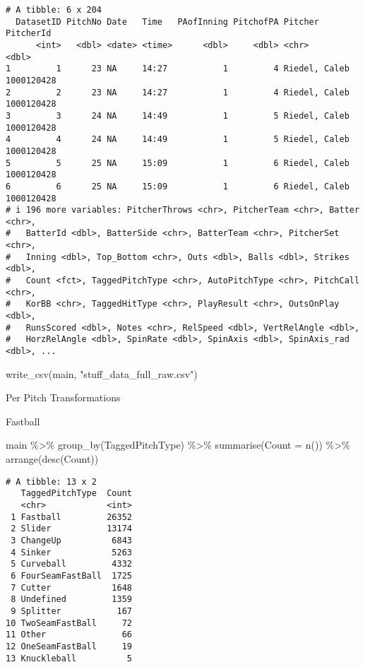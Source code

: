 \documentclass[
  letterpaper,
  DIV=11,
  numbers=noendperiod]{scrartcl}
\newenvironment{Shaded}{\begin{snugshade}}{\end{snugshade}}
\newcommand{\AttributeTok}[1]{\textcolor[rgb]{0.40,0.45,0.13}{#1}}
\newcommand{\FunctionTok}[1]{\textcolor[rgb]{0.28,0.35,0.67}{#1}}
\newcommand{\NormalTok}[1]{\textcolor[rgb]{0.00,0.23,0.31}{#1}}
\newcommand{\SpecialCharTok}[1]{\textcolor[rgb]{0.37,0.37,0.37}{#1}}
\newcommand{\StringTok}[1]{\textcolor[rgb]{0.13,0.47,0.30}{#1}}
\begin{document}
\begin{verbatim}
# A tibble: 6 x 204
  DatasetID PitchNo Date   Time   PAofInning PitchofPA Pitcher        PitcherId
      <int>   <dbl> <date> <time>      <dbl>     <dbl> <chr>              <dbl>
1         1      23 NA     14:27           1         4 Riedel, Caleb 1000120428
2         2      23 NA     14:27           1         4 Riedel, Caleb 1000120428
3         3      24 NA     14:49           1         5 Riedel, Caleb 1000120428
4         4      24 NA     14:49           1         5 Riedel, Caleb 1000120428
5         5      25 NA     15:09           1         6 Riedel, Caleb 1000120428
6         6      25 NA     15:09           1         6 Riedel, Caleb 1000120428
# i 196 more variables: PitcherThrows <chr>, PitcherTeam <chr>, Batter <chr>,
#   BatterId <dbl>, BatterSide <chr>, BatterTeam <chr>, PitcherSet <chr>,
#   Inning <dbl>, Top_Bottom <chr>, Outs <dbl>, Balls <dbl>, Strikes <dbl>,
#   Count <fct>, TaggedPitchType <chr>, AutoPitchType <chr>, PitchCall <chr>,
#   KorBB <chr>, TaggedHitType <chr>, PlayResult <chr>, OutsOnPlay <dbl>,
#   RunsScored <dbl>, Notes <chr>, RelSpeed <dbl>, VertRelAngle <dbl>,
#   HorzRelAngle <dbl>, SpinRate <dbl>, SpinAxis <dbl>, SpinAxis_rad <dbl>, ...
\end{verbatim}

\begin{Shaded}
\begin{Highlighting}[]
\FunctionTok{write\_csv}\NormalTok{(main, }\StringTok{"stuff\_data\_full\_raw.csv"}\NormalTok{)}
\end{Highlighting}
\end{Shaded}

Per Pitch Transformations

Fastball

\begin{Shaded}
\begin{Highlighting}[]
\NormalTok{main }\SpecialCharTok{\%\textgreater{}\%} 
  \FunctionTok{group\_by}\NormalTok{(TaggedPitchType) }\SpecialCharTok{\%\textgreater{}\%}
  \FunctionTok{summarise}\NormalTok{(}\AttributeTok{Count =} \FunctionTok{n}\NormalTok{()) }\SpecialCharTok{\%\textgreater{}\%}
  \FunctionTok{arrange}\NormalTok{(}\FunctionTok{desc}\NormalTok{(Count))}
\end{Highlighting}
\end{Shaded}

\begin{verbatim}
# A tibble: 13 x 2
   TaggedPitchType  Count
   <chr>            <int>
 1 Fastball         26352
 2 Slider           13174
 3 ChangeUp          6843
 4 Sinker            5263
 5 Curveball         4332
 6 FourSeamFastBall  1725
 7 Cutter            1648
 8 Undefined         1359
 9 Splitter           167
10 TwoSeamFastBall     72
11 Other               66
12 OneSeamFastBall     19
13 Knuckleball          5
\end{verbatim}
\end{document}
